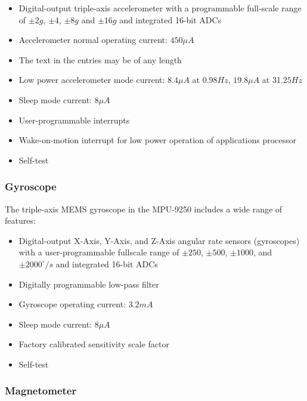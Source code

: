 \begin{itemize}
  \item Digital-output triple-axis accelerometer with a programmable full-scale range  of $\pm 2g$, $\pm 4$, $\pm 8g$ and $\pm 16g$ and integrated 16-bit ADCs
  \item Accelerometer normal operating current: $450 \mu A$
  \item The text in the entries may be of any length
  \item Low power accelerometer mode current: $8.4 \mu A$ at $0.98Hz$, $19.8 \mu A$ at 31.$25Hz$
  \item Sleep mode current: $8 \mu A$
  \item User-programmable interrupts
  \item Wake-on-motion interrupt for low power operation of applications processor
  \item Self-test
\end{itemize}

\begin{figure}[H]
  \centering
  
\end{figure}

\subsubsection{Gyroscope}

The triple-axis MEMS gyroscope in the MPU-9250 includes a wide range of features:

\begin{itemize}
  \item Digital-output X-Axis, Y-Axis, and Z-Axis angular rate sensors (gyroscopes) with a user-programmable fullscale range of $\pm 250$, $\pm 500$, $\pm 1000$, and $\pm 2000^{\circ}/s$ and integrated 16-bit ADCs
  \item Digitally programmable low-pass filter
  \item Gyroscope operating current: $3.2mA$
  \item Sleep mode current: $8 \mu A$
  \item Factory calibrated sensitivity scale factor
  \item Self-test
\end{itemize}

\begin{figure}[H]
  \centering
  
\end{figure}

\subsubsection{Magnetometer}

